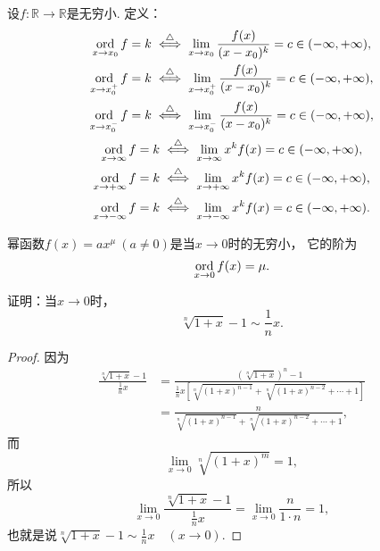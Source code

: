\begin{definition}
设\(f\colon\mathbb{R}\to\mathbb{R}\)是无穷小.
定义：\begin{gather*}
	\operatorname*{ord}_{x \to x_0} f = k
	\overset{\triangle}{\iff}
	\lim_{x \to x_0} \frac{f(x)}{(x-x_0)^k} = c \in (-\infty,+\infty), \\
	\operatorname*{ord}_{x \to x_0^+} f = k
	\overset{\triangle}{\iff}
	\lim_{x \to x_0^+} \frac{f(x)}{(x-x_0)^k} = c \in (-\infty,+\infty), \\
	\operatorname*{ord}_{x \to x_0^-} f = k
	\overset{\triangle}{\iff}
	\lim_{x \to x_0^-} \frac{f(x)}{(x-x_0)^k} = c \in (-\infty,+\infty), \\
	\operatorname*{ord}_{x \to \infty} f = k
	\overset{\triangle}{\iff}
	\lim_{x \to \infty} x^k f(x) = c \in (-\infty,+\infty), \\
	\operatorname*{ord}_{x \to +\infty} f = k
	\overset{\triangle}{\iff}
	\lim_{x \to +\infty} x^k f(x) = c \in (-\infty,+\infty), \\
	\operatorname*{ord}_{x \to -\infty} f = k
	\overset{\triangle}{\iff}
	\lim_{x \to -\infty} x^k f(x) = c \in (-\infty,+\infty).
\end{gather*}
\end{definition}
\begin{example}
幂函数\(f(x) = a x^\mu\ (a\neq0)\)是当\(x\to0\)时的无穷小，
它的阶为\[
	\operatorname*{ord}_{x\to0} f(x) = \mu.
\]
\end{example}

\begin{example}
证明：当\(x\to0\)时，\begin{equation}
	\sqrt[n]{1+x} - 1 \sim \frac1n x.
\end{equation}
\begin{proof}
因为\begin{align*}
	\frac{\sqrt[n]{1+x} - 1}{\frac1n x}
	&= \frac{(\sqrt[n]{1+x})^n - 1}{\frac1n x \left[ \sqrt[n]{(1+x)^{n-1}} + \sqrt[n]{(1+x)^{n-2}} + \dotsb + 1 \right]} \\
	&= \frac{n}{\sqrt[n]{(1+x)^{n-1}} + \sqrt[n]{(1+x)^{n-2}} + \dotsb + 1},
\end{align*}
而\[
	\lim_{x\to0} \sqrt[n]{(1+x)^m} = 1,
\]
所以\[
	\lim_{x\to0} \frac{\sqrt[n]{1+x} - 1}{\frac1n x} = \lim_{x\to0} \frac{n}{1 \cdot n} = 1,
\]
也就是说\(\sqrt[n]{1+x} - 1 \sim \frac1n x \quad(x\to0)\).
\end{proof}
\end{example}

